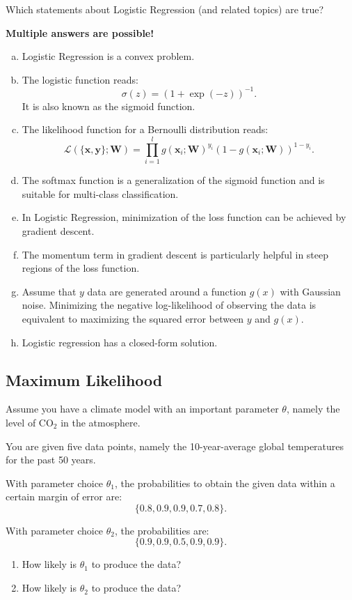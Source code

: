 \documentclass{article}
\begin{document}
Which statements about Logistic Regression (and related topics) are true?

\textbf{Multiple answers are possible!}

\begin{enumerate}[(a)]
    \item Logistic Regression is a convex problem.
    \item The logistic function reads: 
    \[
    \sigma(z) = (1 + \exp(-z))^{-1}.
    \]
    It is also known as the sigmoid function.
    \item The likelihood function for a Bernoulli distribution reads:
    \[
    \mathcal{L}(\{\mathbf{x}, \mathbf{y}\}; \mathbf{W}) = \prod_{i=1}^l g(\mathbf{x}_i; \mathbf{W})^{y_i} (1 - g(\mathbf{x}_i; \mathbf{W}))^{1 - y_i}.
    \]
    \item The softmax function is a generalization of the sigmoid function and is suitable for multi-class classification.
    \item In Logistic Regression, minimization of the loss function can be achieved by gradient descent.
    \item The momentum term in gradient descent is particularly helpful in steep regions of the loss function.
    \item Assume that \(y\) data are generated around a function \(g(x)\) with Gaussian noise. Minimizing the negative log-likelihood of observing the data is equivalent to maximizing the squared error between \(y\) and \(g(x)\).
    \item Logistic regression has a closed-form solution.
\end{enumerate}

\subsection*{Maximum Likelihood}

Assume you have a climate model with an important parameter \(\theta\), namely the level of CO\(_2\) in the atmosphere.

You are given five data points, namely the 10-year-average global temperatures for the past 50 years.

With parameter choice \(\theta_1\), the probabilities to obtain the given data within a certain margin of error are:
\[
\{0.8, 0.9, 0.9, 0.7, 0.8\}.
\]

With parameter choice \(\theta_2\), the probabilities are:
\[
\{0.9, 0.9, 0.5, 0.9, 0.9\}.
\]

\begin{enumerate}
    \item How likely is \(\theta_1\) to produce the data?
    \item How likely is \(\theta_2\) to produce the data?
\end{enumerate}
\end{document}
